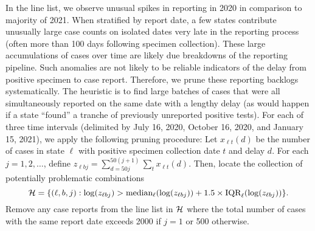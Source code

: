 In the line list, we observe unusual spikes in reporting in 2020 in comparison
to majority of 2021. When stratified by report date, a few states contribute
unusually large case counts on isolated dates very late in the reporting process
(often more than 100 days following specimen collection). These large
accumulations of cases over time are likely due breakdowns of the reporting
pipeline. Such anomalies are not likely to be reliable indicators of the delay
from positive specimen to case report. Therefore, we prune these reporting
backlogs systematically. The heuristic is to find large batches of cases that
were all simultaneously reported on the same date with a lengthy delay (as would
happen if a state ``found'' a tranche of previously unreported positive tests).
For each of three time intervals (delimited by July 16, 2020, 
October 16, 2020, and January 15, 2021), we apply the following pruning procedure:
Let $x_{\ell t}(d)$ be the number of cases in state $\ell$ with positive
specimen collection date $t$ and delay $d$. For each $j=1,2,\ldots$, 
define 
$
z_{\ell bj} = \sum_{d = 50j}^{50(j+1)}\sum_t x_{\ell
t}(d).$ Then, locate the collection of
potentially problematic combinations 
$$
\mathcal{H} = \{(\ell, b, j) : \log(z_{\ell bj}) >
\textrm{median}_{\ell}(\log(z_{\ell bj})) + 1.5
\times\textrm{IQR}_\ell(\log(z_{\ell bj}))\}.
$$
Remove any case reports from the line list in $\mathcal{H}$ where the total number of
cases with the same report date exceeds 2000 if $j=1$ or 500 otherwise.



